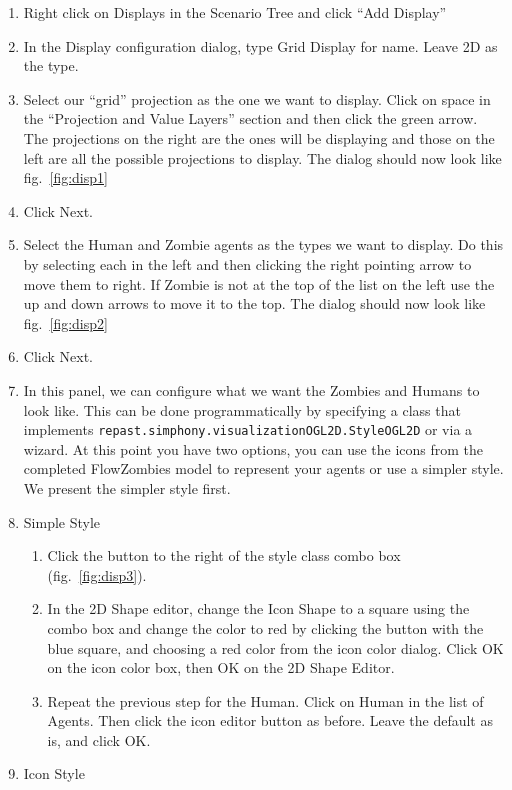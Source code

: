 \documentclass[11pt]{amsart}
\begin{document}
\vspace{.2in}
\begin{enumerate}
\item Right click on Displays in the Scenario Tree and click ``Add Display''
\item In the Display configuration dialog, type Grid Display for name. Leave 2D as the type.
\item Select our ``grid'' projection as the one we want to display. Click on space in the ``Projection and Value Layers'' section and then click the green arrow. The projections on the right are the ones will be displaying and those on the left are all the possible projections to display. The dialog should now look like fig.~\ref{fig:disp1}
\item Click Next.
\item Select the Human and Zombie agents as the types we want to display. Do this by selecting each in the left and then clicking the right pointing arrow to move them to right. If Zombie is not at the top of the list on the left use the up and down arrows to move it to the top. The dialog should now look like fig.~\ref{fig:disp2}
\item Click Next.
\item In this panel, we can configure what we want the Zombies and Humans to look like. This can be done programmatically by specifying a class that implements \texttt{repast.simphony.visualizationOGL2D.StyleOGL2D} or via a wizard. At this point you have two options, you can use the icons from the completed FlowZombies model to represent your agents or use a simpler style. We present the simpler style first.
\item Simple Style
\begin{enumerate}
\item Click the button to the right of the style class combo box (fig.~\ref{fig:disp3}).
\item In the 2D Shape editor, change the Icon Shape to a square using the combo box and change the color to red by clicking the button with the blue square, and choosing a red color from the icon color dialog. Click OK on the icon color box, then OK on the 2D Shape Editor.
\item Repeat the previous step for the Human. Click on Human in the list of Agents. Then click the icon editor button as before. Leave the default as is, and click OK. 
\end{enumerate}
\item Icon Style
\begin{enumerate}

\end{enumerate}
\end{enumerate}
\end{document}
